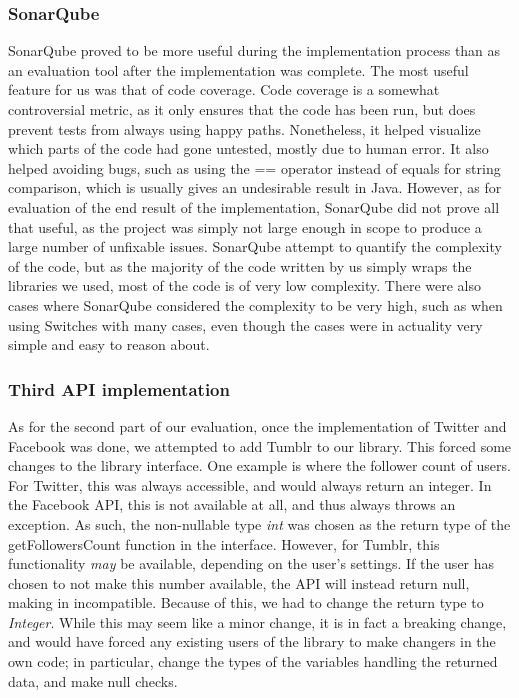 \documentclass{sigchi-alternate}
\begin{document}
\subsubsection{SonarQube}
SonarQube proved to be more useful during the implementation process than as an evaluation tool after the implementation was complete. The most useful feature for us was that of code coverage. Code coverage is a somewhat controversial
metric, as it only ensures that the code has been run, but does prevent tests from always using happy paths. Nonetheless, it helped visualize which parts of the code had gone untested, mostly due to human error. It also helped avoiding
bugs, such as using the == operator instead of equals for string comparison, which is usually gives an undesirable result in Java. However, as for evaluation of the end result of the implementation, SonarQube did not prove all that useful,
as the project was simply not large enough in scope to produce a large number of unfixable issues. SonarQube attempt to quantify the complexity of the code, but as the majority of the code written by us simply wraps the libraries we used,
most of the code is of very low complexity. There were also cases where SonarQube considered the complexity to be very high, such as when using Switches with many cases, even though the cases were in actuality very simple and easy to reason about.

\subsubsection{Third API implementation}
As for the second part of our evaluation, once the implementation of Twitter and Facebook was done, we attempted to add Tumblr to our library. This forced some changes to the library interface. One example is where the follower count of users.
For Twitter, this was always accessible, and would always return an integer. In the Facebook API, this is not available at all, and thus always throws an exception. As such, the non-nullable type \textit{int} was chosen as the return type of
the getFollowersCount function in the interface. However, for Tumblr, this functionality \textit{may} be available, depending on the user's settings. If the user has chosen to not make this number available, the API will instead return null, making in
incompatible. Because of this, we had to change the return type to \textit{Integer}. While this may seem like a minor change, it is in fact a breaking change, and would have forced any existing users of the library to make changers in the own code; in
particular, change the types of the variables handling the returned data, and make null checks.
\end{document}
